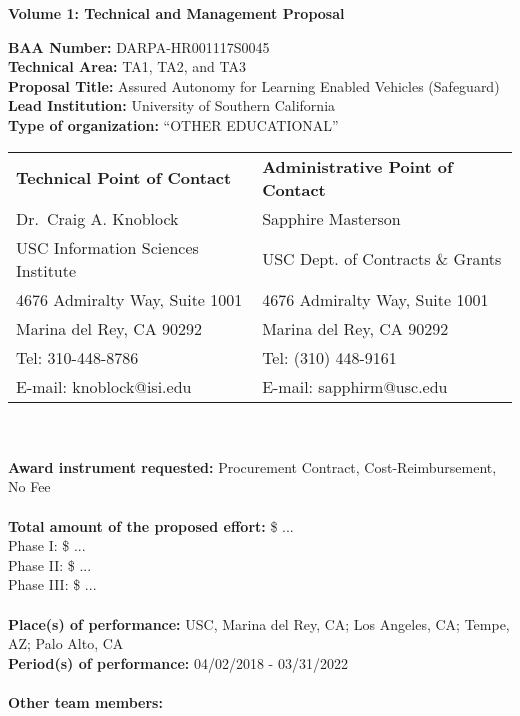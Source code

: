  
\begin{center}
\large{\textbf{Volume 1: Technical and Management Proposal}}
\end{center}
\textbf{BAA Number:} DARPA-HR001117S0045 \\
\textbf{Technical Area:} TA1, TA2, and TA3 \\
\textbf{Proposal Title:} Assured Autonomy for Learning Enabled Vehicles (Safeguard) \\
\textbf{Lead Institution:} University of Southern California \\
\textbf{Type of organization: } “OTHER EDUCATIONAL” \\

\begin{tabularx}{\linewidth}{XX}

 \textbf{Technical Point of Contact} &  \textbf{Administrative Point of Contact }   \\
Dr.\ Craig A. Knoblock  & Sapphire Masterson  \\ 
USC Information Sciences Institute & USC Dept. of Contracts \& Grants \\
4676 Admiralty Way, Suite 1001 & 4676 Admiralty Way, Suite 1001 \\
Marina del Rey, CA 90292 & Marina del Rey, CA 90292 \\
Tel: 310-448-8786 &  Tel: (310) 448-9161 \\
E-mail: knoblock@isi.edu  & E-mail: sapphirm@usc.edu \\
\end{tabularx}
\\
\\
\textbf{Award instrument requested:}  Procurement Contract, Cost-Reimbursement, No Fee
\\
\\
\textbf{Total amount of the proposed effort:} \$ ...\\
Phase I: \$ ... \\
Phase II: \$ ... \\
Phase III: \$ ... \\
\\
\textbf{Place(s) of performance:} USC, Marina del Rey, CA; Los Angeles, CA;  Tempe, AZ; Palo Alto, CA \\
\textbf{Period(s) of performance:} 04/02/2018 - 03/31/2022     \\
\\
\textbf{Other team members:} \\
